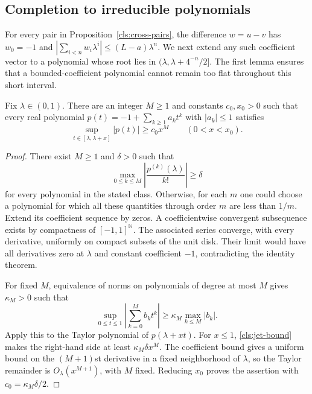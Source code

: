 \subsection{Completion to irreducible polynomials}
\label{cls:subsection-completion}

For every pair in Proposition~\ref{cls:cross-pairs}, the difference
$w=u-v$ has $w_0=-1$ and
$|\sum_{i<n}w_i\lambda^i|\leq(L-a)\lambda^n$.
We next extend any such coefficient vector to a polynomial whose root
lies in $(\lambda,\lambda+4^{-n}/2]$.  The first lemma ensures that a
bounded-coefficient polynomial cannot remain too flat throughout this
short interval.

\begin{lemma}
\label{cls:finite-order}
Fix $\lambda\in(0,1)$.  There are an integer $M\geq1$ and constants
$c_0,x_0>0$ such that every real polynomial
$p(t)=-1+\sum_{k\geq1}a_kt^k$ with $|a_k|\leq1$ satisfies
\[
  \sup_{t\in[\lambda,\lambda+x]}|p(t)|\geq c_0x^M
  \qquad(0<x<x_0).
\]
\end{lemma}

\begin{proof}
There exist $M\geq1$ and $\delta>0$ such that
\begin{equation}
  \max_{0\leq k\leq M}
     \left|\frac{p^{(k)}(\lambda)}{k!}\right|\geq\delta
  \label{cls:jet-bound}
\end{equation}
for every polynomial in the stated class.  Otherwise, for each $m$ one
could choose a polynomial for which all these quantities through order
$m$ are less than $1/m$.  Extend its coefficient sequence by zeros.
A coefficientwise convergent subsequence exists by compactness of
$[-1,1]^{\mathbb N}$.  The associated series converge, with every
derivative, uniformly on compact subsets of the unit disk.  Their limit
would have all derivatives zero at $\lambda$ and constant coefficient
$-1$, contradicting the identity theorem.

For fixed $M$, equivalence of norms on polynomials of degree at most
$M$ gives $\kappa_M>0$ such that
\[
  \sup_{0\leq t\leq1}\left|\sum_{k=0}^M b_kt^k\right|
       \geq\kappa_M\max_{k\leq M}|b_k|.
\]
Apply this to the Taylor polynomial of $p(\lambda+xt)$.
For $x\leq1$, \eqref{cls:jet-bound} makes the right-hand side at least
$\kappa_M\delta x^M$.  The coefficient bound gives a uniform bound on
the $(M+1)$st derivative in a fixed neighborhood of $\lambda$, so the
Taylor remainder is $O_\lambda(x^{M+1})$, with $M$ fixed.  Reducing
$x_0$ proves the assertion with $c_0=\kappa_M\delta/2$.
\end{proof}


